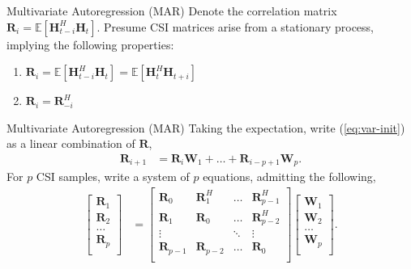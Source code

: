 \documentclass{beamer}
\begin{document}
  \begin{frame}{Multivariate Autoregression (MAR)}
    Denote the correlation matrix 
    $\mathbf R_i = \mathbb E [\mathbf H^H_{t-i}\mathbf H_{t}]$.
    Presume CSI matrices arise from a 
    stationary process, implying the following properties:
    \begin{enumerate}
      \item $\mathbf R_i = \mathbb E [\mathbf H^H_{t-i}\mathbf H_{t}] = \mathbb E [\mathbf H^H_{t}\mathbf H_{t+i}]$
      \item $\mathbf R_i = \mathbf R^H_{-i}$
    \end{enumerate}
  \end{frame}

  \begin{frame}{Multivariate Autoregression (MAR)}
    Taking the expectation, write (\ref{eq:var-init})
    as a linear combination of $\mathbf R$,
    \begin{align*}
    \mathbf R_{i+1} &= \mathbf{R}_{i} \mathbf W_{1} + \dots + \mathbf{R}_{i-p+1} \mathbf W_{p}. 
    \end{align*}
    For $p$ CSI samples, write a system of $p$
    equations, admitting the following,
    \begin{align*}
      \begin{bmatrix}
        \mathbf R_{1} \\ \mathbf R_{2} \\ \dots \\ \mathbf R_{p} \\
      \end{bmatrix}
      &= 
      \begin{bmatrix}
        \mathbf R_{0} & \mathbf R_1^H & \dots  & \mathbf R_{p-1}^H \\
        \mathbf R_{1} & \mathbf R_0   & \dots  & \mathbf R_{p-2}^H \\
        \vdots      &         & \ddots & \vdots \\
        \mathbf R_{p-1} & \mathbf R_{p-2}   & \dots  & \mathbf R_{0} \\
      \end{bmatrix}
      \begin{bmatrix}
        \mathbf W_{1} \\ \mathbf W_{2} \\ \dots \\ \mathbf W_{p} \\
      \end{bmatrix}.
    \end{align*}
  \end{frame}
\end{document}
